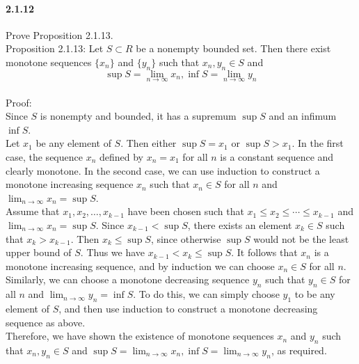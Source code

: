 \documentclass{article}
\begin{document}
\paragraph{2.1.12}
Prove Proposition 2.1.13.\\
Proposition 2.1.13: Let $S \subset R$ be a nonempty bounded set. Then there exist monotone sequences $\{x_n\}$ and $\{y_n\}$ such that $x_n, y_n \in S$ and $$\sup S=\lim_{n\to \infty}x_n, \inf S=\lim_{n\to \infty}y_n$$\\
Proof:\\
Since $S$ is nonempty and bounded, it has a supremum $\sup S$ and an infimum $\inf S$.\\
Let $x_1$ be any element of $S$. Then either $\sup S = x_1$ or $\sup S > x_1$. In the first case, the sequence ${x_n}$ defined by $x_n = x_1$ for all $n$ is a constant sequence and clearly monotone. In the second case, we can use induction to construct a monotone increasing sequence ${x_n}$ such that $x_n \in S$ for all $n$ and $\lim_{n \to \infty} x_n = \sup S$.\\
Assume that $x_1, x_2, \ldots, x_{k-1}$ have been chosen such that $x_1 \leq x_2 \leq \cdots \leq x_{k-1}$ and $\lim_{n \to \infty} x_n = \sup S$. Since $x_{k-1} < \sup S$, there exists an element $x_k \in S$ such that $x_k > x_{k-1}$. Then $x_k \leq \sup S$, since otherwise $\sup S$ would not be the least upper bound of $S$. Thus we have $x_{k-1} < x_k \leq \sup S$. It follows that ${x_n}$ is a monotone increasing sequence, and by induction we can choose $x_n \in S$ for all $n$.\\
Similarly, we can choose a monotone decreasing sequence ${y_n}$ such that $y_n \in S$ for all $n$ and $\lim_{n \to \infty} y_n = \inf S$. To do this, we can simply choose $y_1$ to be any element of $S$, and then use induction to construct a monotone decreasing sequence as above.\\
Therefore, we have shown the existence of monotone sequences ${x_n}$ and ${y_n}$ such that $x_n, y_n \in S$ and $\sup S=\lim_{n\to \infty}x_n, \inf S=\lim_{n\to \infty}y_n$, as required.
\end{document}
